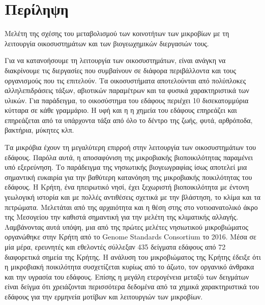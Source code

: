 \documentclass[11pt]{article}
\begin{document}
\section*{Περίληψη}
{\LARGE Μελέτη της σχέσης του μεταβολισμού των κοινοτήτων των μικροβίων με τη λειτουργία οικοσυστημάτων και των βιογεωχημικών διεργασιών τους.}


\vspace{1cm}

Για να κατανοήσουμε τη λειτουργία των οικοσυστημάτων, είναι ανάγκη να διακρίνουμε
τις διεργασίες που συμβαίνουν σε διάφορα περιβάλλοντα και τους οργανισμούς
που τις επιτελούν. Τα οικοσυστήματα αποτελούνται από πολύπλοκες αλληλεπιδράσεις τάξων,
αβιοτικών παραμέτρων και τα φυσικά χαρακτηριστικά των υλικών. Για παράδειγμα,
το οικοσύστημα του εδάφους περιέχει 10 δισεκατομμύρια κύτταρα σε κάθε γραμμάριο. Η υφή και η
η χημεία του εδάφους επηρεάζει και επηρεάζεται από τα υπάρχοντα τάξα από όλο το
δέντρο της ζωής, φυτά, αρθρόποδα, βακτήρια, μύκητες κλπ.

Τα μικρόβια έχουν τη μεγαλύτερη επιρροή στην λειτουργία των οικοσυστημάτων του εδάφους. 
Παρόλα αυτά, η αποσαφύνιση της μικροβιακής βιοποικιλότητας παραμένει υπό εξερεύνηση.
Το παράδειγμα της νησιωτικής βιογεωγραφίας ίσως αποτελεί μια σημαντική ευκαιρία για 
την βαθύτερη κατανόηση της μικροβιακής ποικιλότητας του εδάφους. 
Η Κρήτη, ένα ηπειρωτικό νησί, έχει ξεχωριστή βιοποικιλότητα με έντονη γεωλογική 
ιστορία και με πολλές αντιθέσεις σχετικά με την βλάστηση, το κλίμα και τα πετρώματα. 
Μελετάται από της αρχαιότητα και η θέση στης στο νοτιοανατολικό άκρο της Μεσογείου 
την καθιστά σημαντική για την μελέτη της κλιματικής αλλαγής.
Λαμβάνοντας αυτά υπόψη, μια από της πρώτες μελέτες νησιωτικού μικροβιώματος 
οργανώθηκε στην Κρήτη από το \textlatin{Genome Standards Consortium} το 2016. 
Μέσα σε μία μέρα, ερευνητές και εθελοντές σύλλεξαν 435 δείγματα εδάφους 
από 72 διαφορετικά σημεία της Κρήτης. 
Η ανάλυση του μικροβιώματος της Κρήτης έδειξε ότι η μικροβιακή ποικιλότητα
συσχετίζεται κυρίως από το άζωτο, τον οργανικό άνθρακα και την υγρασία του εδάφους.
Επίσης η μεγάλη ετερογένεια μεταξύ των δειγμάτων είναι δείγμα ότι χρειάζονται περισσότερα 
δεδομένα από τα χημικά χαρακτηριστικά του εδάφους για την ερμηνεία μοτίβων και λειτουργιών 
των μικροβίων.
\end{document}
